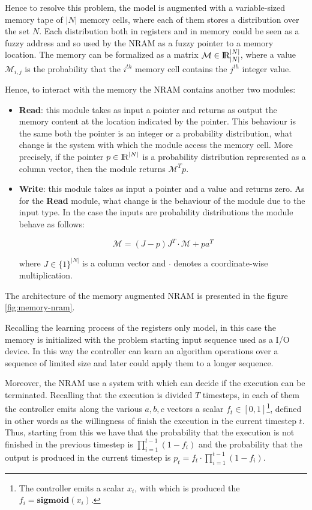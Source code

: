 Hence to resolve this problem, the model is augmented with a variable-sized memory tape of $|N|$ memory cells, where each of them stores a distribution over the set $N$. Each distribution both in registers and in memory could be seen as a fuzzy address and so used by the NRAM as a fuzzy pointer to a memory location. The memory can be formalized as a matrix $\mathcal{M} \in \textrm{I\!R}_{|N|}^{|N|}$, where a value $\mathcal{M}_{i,j}$ is the probability that the $i^{th}$ memory cell contains the $j^{th}$ integer value.

Hence, to interact with the memory the NRAM contains another two modules:
\begin{itemize}
	\item{\textbf{Read}: this module takes as input a pointer and returns as output the memory content at the location indicated by the pointer. This behaviour is the same both the pointer is an integer or a probability distribution, what change is the system with which the module access the memory cell. More precisely, if the pointer $p\in\textrm{I\!R}^{|N|}$ is a probability distribution represented as a column vector, then the module returns $\mathcal{M}^{T}p$.}
	\item{\textbf{Write}: this module takes as input a pointer and a value and returns zero. As for the \textbf{Read} module,  what change is the behaviour of the module due to the input type. In the case the inputs are probability distributions the module behave as follows:
\begin{center}
	\begin{equation}
	\mathcal{M} = (J - p)J^{T} \cdot \mathcal{M} + pa^{T}
	\end{equation}
\end{center}	
where $J \in \{1\}^{|N|}$ is a column vector and $\cdot$ denotes a coordinate-wise multiplication.
}
\end{itemize}
The architecture of the memory augmented NRAM is presented in the figure \ref{fig:memory-nram}.

Recalling the learning process of the registers only model, in this case the memory is initialized with the problem starting input sequence used as a I/O device. In this way the controller can learn an algorithm operations over a sequence of limited size and later could apply them to a longer sequence.

Moreover, the NRAM use a system with which can decide if the execution can be terminated. Recalling that the execution is divided $T$ timesteps, in each of them the controller emits along the various $a, b, c$ vectors a scalar $f_{t} \in [0, 1]$\footnote{The controller emits a scalar $x_{i}$, with which is produced the $f_i = \textbf{sigmoid}(x_{i})$.}, defined in other words as the willingness of finish the execution in the current timestep $t$. Thus, starting from this we have that the probability that the execution is not finished in the previous timestep is $\prod\limits_{i=1}^{t-1}(1 - f_{i})$ and the probability that the output is produced in the current timestep is $p_{t} = f_{t} \cdot \prod\limits_{i=1}^{t-1}(1 - f_{i})$. 

